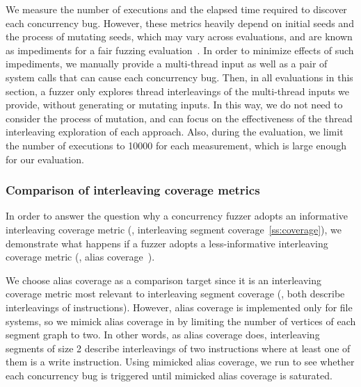 %
We measure the number of executions and the elapsed time required to
discover each concurrency bug.
%
However, these metrics heavily depend on initial seeds and the process
of mutating seeds, which may vary across evaluations, and are known as
impediments for a fair fuzzing evaluation~\cite{fuzzingeval}.
%
In order to minimize effects of such impediments, we manually provide
a multi-thread input as well as a pair of system calls that can cause
each concurrency bug.
%
Then, in all evaluations in this section, a fuzzer only explores
thread interleavings of the multi-thread inputs we provide, without
generating or mutating inputs.
%
In this way, we do not need to consider the process of mutation, and
can focus on the effectiveness of the thread interleaving exploration
of each approach.
%
Also, during the evaluation, we limit the number of executions to
10000 for each measurement, which is large enough for our evaluation.
%





\subsubsection{Comparison of interleaving coverage metrics}
\label{sss:interleavingcoverage}
%
In order to answer the question why a concurrency fuzzer adopts an
informative interleaving coverage metric (\ie, interleaving segment
coverage~\autoref{ss:coverage}), we demonstrate what happens if a
fuzzer adopts a less-informative interleaving coverage metric (\eg,
alias coverage~\cite{krace}).


%
We choose alias coverage as a comparison target since it is an
interleaving coverage metric most relevant to interleaving segment
coverage (\ie, both describe interleavings of instructions).
%
However, alias coverage is implemented only for file systems, so we
mimick alias coverage in \sys by limiting the number of vertices of
each segment graph to two. In other words, as alias coverage does,
interleaving segments of size 2 describe interleavings of two
instructions where at least one of them is a write instruction.
%
Using mimicked alias coverage, we run \sys to see whether each
concurrency bug is triggered until mimicked alias coverage is
saturated.




